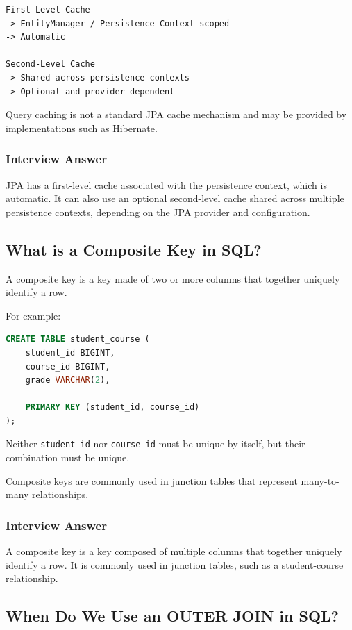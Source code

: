 \documentclass[12pt,a4paper]{article}
\begin{document}
\begin{verbatim}
First-Level Cache
-> EntityManager / Persistence Context scoped
-> Automatic

Second-Level Cache
-> Shared across persistence contexts
-> Optional and provider-dependent
\end{verbatim}

Query caching is not a standard JPA cache mechanism and may be provided by
implementations such as Hibernate.

\subsubsection*{Interview Answer}

JPA has a first-level cache associated with the persistence context, which
is automatic. It can also use an optional second-level cache shared across
multiple persistence contexts, depending on the JPA provider and
configuration.

\subsection{What is a Composite Key in SQL?}

A composite key is a key made of two or more columns that together uniquely
identify a row.

For example:

\begin{lstlisting}[language=SQL]
CREATE TABLE student_course (
    student_id BIGINT,
    course_id BIGINT,
    grade VARCHAR(2),

    PRIMARY KEY (student_id, course_id)
);
\end{lstlisting}

Neither \texttt{student\_id} nor \texttt{course\_id} must be unique by
itself, but their combination must be unique.

Composite keys are commonly used in junction tables that represent
many-to-many relationships.

\subsubsection*{Interview Answer}

A composite key is a key composed of multiple columns that together uniquely
identify a row. It is commonly used in junction tables, such as a
student-course relationship.

\subsection{When Do We Use an OUTER JOIN in SQL?}
\end{document}
